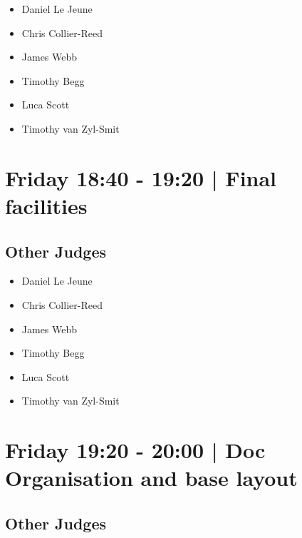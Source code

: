 \documentclass[10pt]{article}
\begin{document}
            \begin{itemize}
                            \item Daniel Le Jeune
                            \item Chris Collier-Reed
                            \item James Webb
                            \item Timothy Begg
                            \item Luca Scott
                            \item Timothy van Zyl-Smit
                        \end{itemize}
        

            \section*{Friday 18:40
        -
        19:20
        |
         Final facilities}
        
                
        \subsection*{Other Judges}
        
            \begin{itemize}
                            \item Daniel Le Jeune
                            \item Chris Collier-Reed
                            \item James Webb
                            \item Timothy Begg
                            \item Luca Scott
                            \item Timothy van Zyl-Smit
                        \end{itemize}
        

            \section*{Friday 19:20
        -
        20:00
        |
         Doc Organisation and base layout}
        
                
        \subsection*{Other Judges}
        
\end{document}
